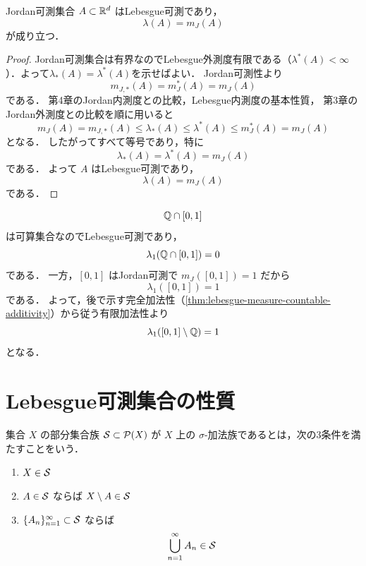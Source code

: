 \begin{theorem}[Jordan可測集合]\label{thm:jordan-measurable-lebesgue}
Jordan可測集合 $A\subset\mathbb R^d$ はLebesgue可測であり，
\[
\lambda(A)=m_J(A)
\]
が成り立つ．
\end{theorem}
\begin{proof}
    Jordan可測集合は有界なのでLebesgue外測度有限である（$\lambda^*(A) < \infty$）．よって$\lambda_*(A)=\lambda^*(A)$を示せばよい．
Jordan可測性より
\[
m_{J,*}(A)=m_J^*(A)=m_J(A)
\]
である．
第4章のJordan内測度との比較，Lebesgue内測度の基本性質，
第3章のJordan外測度との比較を順に用いると
\[
m_J(A)
=m_{J,*}(A)
\le \lambda_*(A)
\le \lambda^*(A)
\le m_J^*(A)
=m_J(A)
\]
となる．
したがってすべて等号であり，特に
\[
\lambda_*(A)=\lambda^*(A)=m_J(A)
\]
である．
よって $A$ はLebesgue可測であり，
\[
\lambda(A)=m_J(A)
\]
である．
\end{proof}

\begin{example}
\[
\mathbb Q\cap[0,1]
\]
は可算集合なのでLebesgue可測であり，
\[
\lambda_1(\mathbb Q\cap[0,1])=0
\]
である．
一方，$[0,1]$ はJordan可測で $m_J([0,1])=1$ だから
\[
\lambda_1([0,1])=1
\]
である．
よって，後で示す完全加法性（\cref{thm:lebesgue-measure-countable-additivity}）から従う有限加法性より
\[
\lambda_1([0,1]\setminus\mathbb Q)=1
\]
となる．
\end{example}

\section{Lebesgue可測集合の性質}

\begin{definition}
集合 $X$ の部分集合族 $\mathcal S\subset\mathcal P(X)$ が
$X$ 上の $\sigma$-加法族であるとは，次の3条件を満たすことをいう．
\begin{enumerate}
    \item $X\in\mathcal S$
    \item $A\in\mathcal S$ ならば $X\setminus A\in\mathcal S$
    \item $\{A_n\}_{n=1}^{\infty}\subset\mathcal S$ ならば
    \[
    \bigcup_{n=1}^{\infty}A_n\in\mathcal S
    \]
\end{enumerate}
\end{definition}

